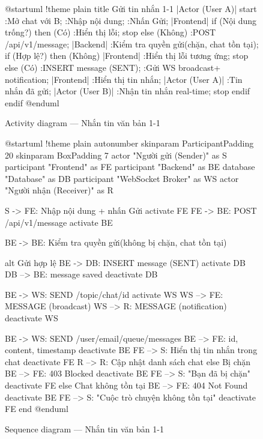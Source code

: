\documentclass[12pt,a4paper]{report}
\begin{document}
\renewcommand{\arraystretch}{1}

\begin{figure}[H]
    \centering
    \begin{plantuml}
        @startuml
        !theme plain
        title Gửi tin nhắn 1-1
        |Actor (User A)|
        start
        :Mở chat với B;
        :Nhập nội dung;
        :Nhấn Gửi;
        |Frontend|
        if (Nội dung trống?) then (Có)
          :Hiển thị lỗi;
          stop
        else (Không)
          :POST /api/v1/message;
        |Backend|
          :Kiểm tra quyền gửi\n(chặn, chat tồn tại);
          if (Hợp lệ?) then (Không)
            |Frontend|
            :Hiển thị lỗi tương ứng;
            stop
          else (Có)
            :INSERT message (SENT);
            :Gửi WS broadcast\n+ notification;
            |Frontend|
            :Hiển thị tin nhắn;
            |Actor (User A)|
            :Tin nhắn đã gửi;
            |Actor (User B)|
            :Nhận tin nhắn real-time;
            stop
          endif
        endif
        @enduml
    \end{plantuml}
    \caption{Activity diagram --- Nhắn tin văn bản 1-1}
\end{figure}

\begin{figure}[H]
    \centering
    \begin{plantuml}
        @startuml
        !theme plain
        autonumber
        skinparam ParticipantPadding 20
        skinparam BoxPadding 7
        actor "Người gửi (Sender)" as S
        participant "Frontend" as FE
        participant "Backend" as BE
        database "Database" as DB
        participant "WebSocket Broker" as WS
        actor "Người nhận (Receiver)" as R

        S -> FE: Nhập nội dung + nhấn Gửi
        activate FE
        FE -> BE: POST /api/v1/message 
        activate BE

        BE -> BE: Kiểm tra quyền gửi\n(không bị chặn, chat tồn tại)

        alt Gửi hợp lệ
          BE -> DB: INSERT message (SENT)
          activate DB
          DB --> BE: message saved
          deactivate DB

          BE -> WS: SEND /topic/chat/{id}
          activate WS
          WS --> FE: MESSAGE (broadcast)
          WS --> R: MESSAGE (notification)
          deactivate WS

          BE -> WS: SEND /user/{email}/queue/messages
          BE --> FE: { id, content, timestamp }
          deactivate BE
          FE --> S: Hiển thị tin nhắn trong chat
          deactivate FE
          R --> R: Cập nhật danh sách chat
        else Bị chặn
          BE --> FE: 403 Blocked
          deactivate BE
          FE --> S: "Bạn đã bị chặn"
          deactivate FE
        else Chat không tồn tại
          BE --> FE: 404 Not Found
          deactivate BE
          FE --> S: "Cuộc trò chuyện không tồn tại"
          deactivate FE
        end
        @enduml
    \end{plantuml}
    \caption{Sequence diagram --- Nhắn tin văn bản 1-1}
\end{figure}
\end{document}
